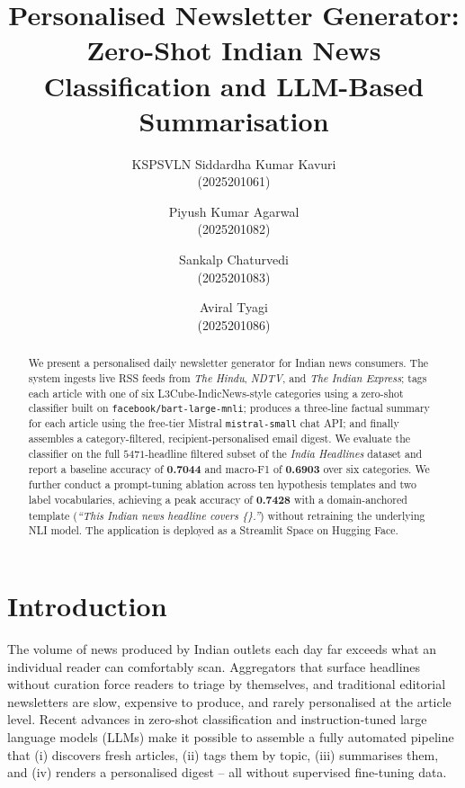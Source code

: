 \documentclass[10pt,twocolumn,letterpaper]{article}
\begin{document}
\title{Personalised Newsletter Generator: \\ Zero-Shot Indian News Classification and LLM-Based Summarisation}

\author{KSPSVLN Siddardha Kumar Kavuri\\(2025201061)
\and Piyush Kumar Agarwal\\(2025201082)
\and Sankalp Chaturvedi\\(2025201083)
\and Aviral Tyagi\\(2025201086)}

\maketitle

\begin{abstract}
We present a personalised daily newsletter generator for Indian news consumers. The system ingests live RSS feeds from \textit{The Hindu}, \textit{NDTV}, and \textit{The Indian Express}; tags each article with one of six L3Cube-IndicNews-style categories using a zero-shot classifier built on \texttt{facebook/bart-large-mnli}; produces a three-line factual summary for each article using the free-tier Mistral \texttt{mistral-small} chat API; and finally assembles a category-filtered, recipient-personalised email digest. We evaluate the classifier on the full $5471$-headline filtered subset of the \textit{India Headlines} dataset and report a baseline accuracy of \textbf{0.7044} and macro-F1 of \textbf{0.6903} over six categories. We further conduct a prompt-tuning ablation across ten hypothesis templates and two label vocabularies, achieving a peak accuracy of \textbf{0.7428} with a domain-anchored template (\textit{``This Indian news headline covers \{\}.''}) without retraining the underlying NLI model. The application is deployed as a Streamlit Space on Hugging Face.
\end{abstract}

\section{Introduction}
\label{sec:intro}
The volume of news produced by Indian outlets each day far exceeds what an individual reader can comfortably scan. Aggregators that surface headlines without curation force readers to triage by themselves, and traditional editorial newsletters are slow, expensive to produce, and rarely personalised at the article level. Recent advances in zero-shot classification and instruction-tuned large language models (LLMs) make it possible to assemble a fully automated pipeline that (i) discovers fresh articles, (ii) tags them by topic, (iii) summarises them, and (iv) renders a personalised digest -- all without supervised fine-tuning data.
\end{document}
